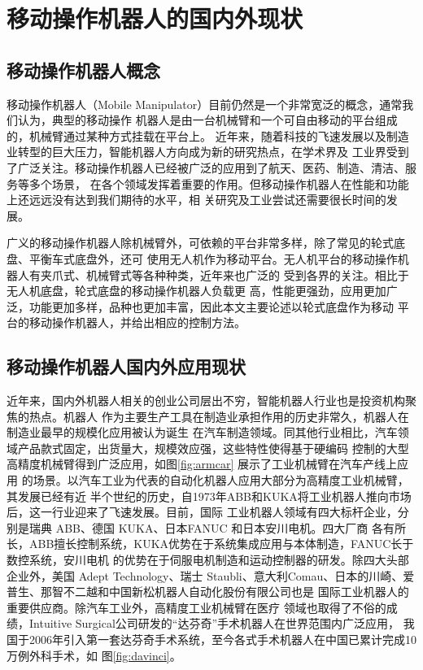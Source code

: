 
\chapter{移动操作机器人的国内外现状}
\label{cha:intro}

\section{移动操作机器人概念}
\label{cha:base_comcept}

移动操作机器人（Mobile Manipulator）目前仍然是一个非常宽泛的概念，通常我们认为，典型的移动操作
机器人是由一台机械臂和一个可自由移动的平台组成的，机械臂通过某种方式挂载在平台上\cite{bostelman2016survey}。
近年来，随着科技的飞速发展以及制造业转型的巨大压力，智能机器人方向成为新的研究热点，在学术界及
工业界受到了广泛关注\cite{schneier2015literature}。移动操作机器人已经被广泛的应用到了航天\cite{ambrose2004mobile}、医药、制造\cite{guizzo2011meka}、清洁、服务等多个场景，
在各个领域发挥着重要的作用。但移动操作机器人在性能和功能上还远远没有达到我们期待的水平，相
关研究及工业尝试还需要很长时间的发展。

广义的移动操作机器人除机械臂外，可依赖的平台非常多样，除了常见的轮式底盘、平衡车式底盘外，还可
使用无人机作为移动平台。无人机平台的移动操作机器人有夹爪式、机械臂式等各种种类，近年来也广泛的
受到各界的关注\cite{ruggiero2018aerial}。相比于无人机底盘，轮式底盘的移动操作机器人负载更
高，性能更强劲，应用更加广泛，功能更加多样，品种也更加丰富，因此本文主要论述以轮式底盘作为移动
平台的移动操作机器人，并给出相应的控制方法。

\section{移动操作机器人国内外应用现状}
\label{cha:application}

近年来，国内外机器人相关的创业公司层出不穷，智能机器人行业也是投资机构聚焦的热点。机器人
作为主要生产工具在制造业承担作用的历史非常久，机器人在制造业最早的规模化应用被认为诞生
在汽车制造领域。同其他行业相比，汽车领域产品款式固定，出货量大，规模效应强，这些特性使得基于硬编码
控制的大型高精度机械臂得到广泛应用，如图\ref{fig:armcar} 展示了工业机械臂在汽车产线上应用
的场景。以汽车工业为代表的自动化机器人应用大部分为高精度工业机械臂，其发展已经有近
半个世纪的历史，自1973年ABB和KUKA将工业机器人推向市场后，这一行业迎来了飞速发展。目前，国际
工业机器人领域有四大标杆企业，分别是瑞典 ABB、德国 KUKA、日本FANUC 和日本安川电机。四大厂商
各有所长，ABB擅长控制系统，KUKA优势在于系统集成应用与本体制造，FANUC长于数控系统，安川电机
的优势在于伺服电机制造和运动控制器的研发。除四大头部企业外，美国 Adept Technology、瑞士
Staubli、意大利Comau、日本的川崎、爱普生、那智不二越和中国新松机器人自动化股份有限公司也是
国际工业机器人的重要供应商\cite{huangxihuanReview}。除汽车工业外，高精度工业机械臂在医疗
领域也取得了不俗的成绩，Intuitive Surgical公司研发的“达芬奇”手术机器人在世界范围内广泛应用，
我国于2006年引入第一套达芬奇手术系统，至今各式手术机器人在中国已累计完成10万例外科手术，如
图\ref{fig:davinci}。

